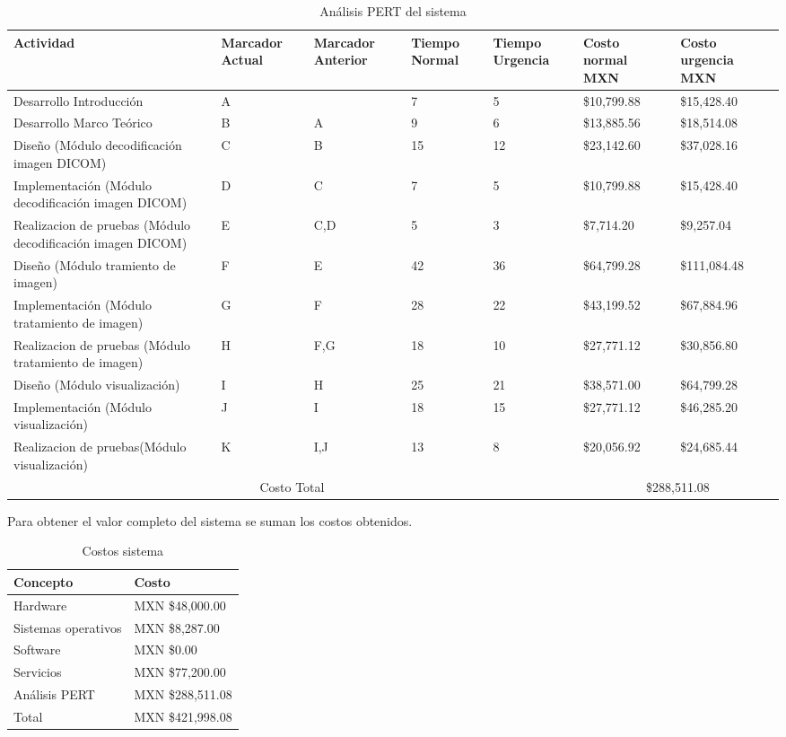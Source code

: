 \documentclass[12pt]{report}
\begin{document}
\begin{table}[H]
\scriptsize
\begin{center}
\begin{tabular}{|p{2.5cm}|p{1.5cm}|p{1.5cm}|p{1.5cm}|p{1.5cm}|p{1.5cm}|p{1.5cm}|}
\hline
Actividad & Marcador Actual & Marcador Anterior & Tiempo Normal & Tiempo Urgencia & Costo normal MXN & Costo urgencia MXN\\ 
\hline \hline
Desarrollo Introducción & A & & 7 & 5 &  \$10,799.88 &  \$15,428.40 \\
\hline
Desarrollo Marco Teórico & B & A & 9 & 6 &  \$13,885.56 &  \$18,514.08 \\
\hline
Diseño (Módulo decodificación imagen DICOM) & C & B & 15 & 12 &  \$23,142.60 &  \$37,028.16\\
\hline
Implementación (Módulo decodificación imagen DICOM) & D & C & 7 & 5 &  \$10,799.88 &  \$15,428.40 \\
\hline
Realizacion de pruebas (Módulo decodificación imagen DICOM) & E & C,D & 5 & 3 &  \$7,714.20 &  \$9,257.04\\ 
\hline
Diseño (Módulo tramiento de imagen) & F & E & 42 & 36 &  \$64,799.28 &  \$111,084.48\\ 
\hline
Implementación (Módulo tratamiento de imagen) & G & F & 28 & 22 &  \$43,199.52 &  \$67,884.96\\
\hline
Realizacion de pruebas (Módulo tratamiento de imagen) & H & F,G & 18 & 10 &  \$27,771.12 &  \$30,856.80\\
\hline
Diseño (Módulo visualización) & I & H & 25 & 21 &  \$38,571.00 &   \$64,799.28\\
\hline
Implementación (Módulo visualización) & J & I & 18 & 15 &  \$27,771.12 &  \$46,285.20\\
\hline
Realizacion de pruebas(Módulo visualización) & K & I,J & 13 & 8 &  \$20,056.92 &  \$24,685.44\\
\hline
\multicolumn{5}{|c|}{Costo Total} & \multicolumn{2}{|c|}{\$288,511.08}\\
\hline
\end{tabular}
\caption{Análisis PERT del sistema}
\end{center}
\end{table}

Para obtener el valor  completo del sistema se suman los costos obtenidos.
\begin{table}[H]
\begin{center}
\begin{tabular}{|p{30mm}|p{50mm}|}
\hline
Concepto & Costo\\
\hline \hline 
Hardware & MXN \$48,000.00\\
\hline
Sistemas operativos &  MXN \$8,287.00\\
\hline
Software & MXN \$0.00\\
\hline
Servicios & MXN \$77,200.00\\
\hline
Análisis PERT & MXN \$288,511.08\\
\hline \hline
Total & MXN \$421,998.08\\
\hline
\end{tabular}
\caption{Costos sistema}
\end{center}
\end{table}
\end{document}
